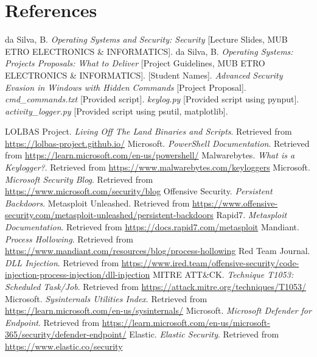 \documentclass[11pt]{article}
\begin{document}
	\section*{References}
	\begin{thebibliography}{99}
		 da Silva, B. \textit{Operating Systems and Security: Security} [Lecture Slides, MUB ETRO ELECTRONICS \& INFORMATICS].
		 da Silva, B. \textit{Operating Systems: Projects Proposals: What to Deliver} [Project Guidelines, MUB ETRO ELECTRONICS \& INFORMATICS].
		 [Student Names]. \textit{Advanced Security Evasion in Windows with Hidden Commands} [Project Proposal].
		 \textit{cmd_commands.txt} [Provided script].
		 \textit{keylog.py} [Provided script using pynput].
		 \textit{activity_logger.py} [Provided script using psutil, matplotlib].
		
		 LOLBAS Project. \textit{Living Off The Land Binaries and Scripts}. Retrieved from \url{https://lolbas-project.github.io/}
		 Microsoft. \textit{PowerShell Documentation}. Retrieved from \url{https://learn.microsoft.com/en-us/powershell/}
		 Malwarebytes. \textit{What is a Keylogger?}. Retrieved from \url{https://www.malwarebytes.com/keyloggers}
		 Microsoft. \textit{Microsoft Security Blog}. Retrieved from \url{https://www.microsoft.com/security/blog}
		 Offensive Security. \textit{Persistent Backdoors}. Metasploit Unleashed. Retrieved from \url{https://www.offensive-security.com/metasploit-unleashed/persistent-backdoors}
		 Rapid7. \textit{Metasploit Documentation}. Retrieved from \url{https://docs.rapid7.com/metasploit}
		 Mandiant. \textit{Process Hollowing}. Retrieved from \url{https://www.mandiant.com/resources/blog/process-hollowing} %
		 Red Team Journal. \textit{DLL Injection}. Retrieved from \url{https://www.ired.team/offensive-security/code-injection-process-injection/dll-injection} %
		 MITRE ATT\&CK. \textit{Technique T1053: Scheduled Task/Job}. Retrieved from \url{https://attack.mitre.org/techniques/T1053/}
		 Microsoft. \textit{Sysinternals Utilities Index}. Retrieved from \url{https://learn.microsoft.com/en-us/sysinternals/}
		 Microsoft. \textit{Microsoft Defender for Endpoint}. Retrieved from \url{https://learn.microsoft.com/en-us/microsoft-365/security/defender-endpoint/}
		 Elastic. \textit{Elastic Security}. Retrieved from \url{https://www.elastic.co/security}
		

\end{thebibliography}
\end{document}
